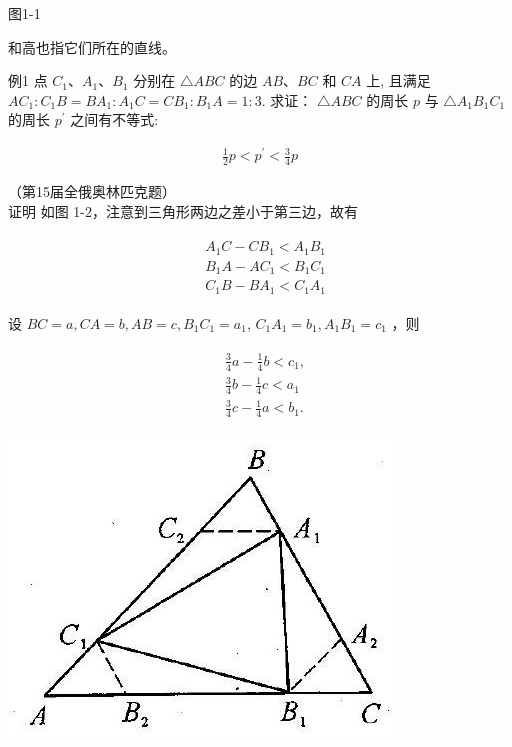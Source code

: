 \documentclass[10pt]{article}
\begin{document}
图1-1

和高也指它们所在的直线。

例1 点 $C_{1} 、 A_{1} 、 B_{1}$ 分别在 $\triangle A B C$ 的边 $A B 、 B C$ 和 $C A$ 上, 且满足 $A C_{1}: C_{1} B=B A_{1}: A_{1} C=C B_{1}: B_{1} A=1: 3$. 求证： $\triangle A B C$ 的周长 $p$ 与 $\triangle A_{1} B_{1} C_{1}$ 的周长 $p^{\prime}$ 之间有不等式:

\begin{align*}
\frac{1}{2} p<p^{\prime}<\frac{3}{4} p
\end{align*}

（第15届全俄奥林匹克题）\\
证明 如图 1-2，注意到三角形两边之差小于第三边，故有

\begin{align*}
\begin{aligned}
& A_{1} C-C B_{1}<A_{1} B_{1} \\
& B_{1} A-A C_{1}<B_{1} C_{1} \\
& C_{1} B-B A_{1}<C_{1} A_{1}
\end{aligned}
\end{align*}

设 $B C=a, C A=b, A B=c, B_{1} C_{1}=a_{1}$, $C_{1} A_{1}=b_{1}, A_{1} B_{1}=c_{1}$ ，则

\begin{align*}
\begin{aligned}
& \frac{3}{4} a-\frac{1}{4} b<c_{1}, \\
& \frac{3}{4} b-\frac{1}{4} c<a_{1} \\
& \frac{3}{4} c-\frac{1}{4} a<b_{1} .
\end{aligned}
\end{align*}

\begin{center}
\includegraphics[max width=\textwidth]{2024_10_30_2c8f45efd4a519b08e1ag-008(1)}
\end{center}
\end{document}
